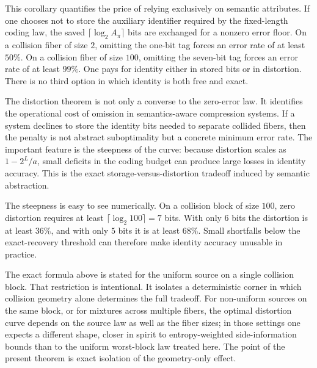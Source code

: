 \begin{remark}
This corollary quantifies the price of relying exclusively on semantic attributes. If one chooses not to store the auxiliary identifier required by the fixed-length coding law, the saved $\lceil \log_2 A_\pi \rceil$ bits are exchanged for a nonzero error floor. On a collision fiber of size $2$, omitting the one-bit tag forces an error rate of at least $50\%$. On a collision fiber of size $100$, omitting the seven-bit tag forces an error rate of at least $99\%$. One pays for identity either in stored bits or in distortion. There is no third option in which identity is both free and exact.
\end{remark}

\begin{remark}
The distortion theorem is not only a converse to the zero-error law. It identifies the operational cost of omission in semantics-aware compression systems. If a system declines to store the identity bits needed to separate collided fibers, then the penalty is not abstract suboptimality but a concrete minimum error rate. The important feature is the steepness of the curve: because distortion scales as $1-2^L/a$, small deficits in the coding budget can produce large losses in identity accuracy. This is the exact storage-versus-distortion tradeoff induced by semantic abstraction.
\end{remark}

\begin{remark}[Steepness]
The steepness is easy to see numerically. On a collision block of size $100$, zero distortion requires at least $\lceil \log_2 100 \rceil = 7$ bits. With only $6$ bits the distortion is at least $36\%$, and with only $5$ bits it is at least $68\%$. Small shortfalls below the exact-recovery threshold can therefore make identity accuracy unusable in practice.
\end{remark}

\begin{remark}
The exact formula above is stated for the uniform source on a single collision block. That restriction is intentional. It isolates a deterministic corner in which collision geometry alone determines the full tradeoff. For non-uniform sources on the same block, or for mixtures across multiple fibers, the optimal distortion curve depends on the source law as well as the fiber sizes; in those settings one expects a different shape, closer in spirit to entropy-weighted side-information bounds than to the uniform worst-block law treated here. The point of the present theorem is exact isolation of the geometry-only effect.
\end{remark}

